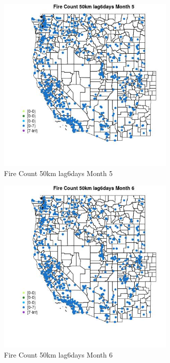 \begin{figure} 
\centering  
\includegraphics[width=0.77\textwidth]{Code_Outputs/Report_ML_input_PM25_Step4_part_e_de_duplicated_aves_compiled_2019-05-21wNAs_MapObsMo5Fire_Count_50km_lag6days.jpg} 
\caption{\label{fig:Report_ML_input_PM25_Step4_part_e_de_duplicated_aves_compiled_2019-05-21wNAsMapObsMo5Fire_Count_50km_lag6days}Fire Count 50km lag6days Month 5} 
\end{figure} 
 

\begin{figure} 
\centering  
\includegraphics[width=0.77\textwidth]{Code_Outputs/Report_ML_input_PM25_Step4_part_e_de_duplicated_aves_compiled_2019-05-21wNAs_MapObsMo6Fire_Count_50km_lag6days.jpg} 
\caption{\label{fig:Report_ML_input_PM25_Step4_part_e_de_duplicated_aves_compiled_2019-05-21wNAsMapObsMo6Fire_Count_50km_lag6days}Fire Count 50km lag6days Month 6} 
\end{figure} 
 

